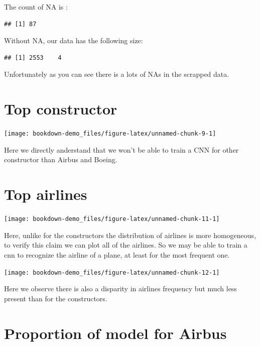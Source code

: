 \documentclass[]{book}
\begin{document}
The count of NA is :

\begin{verbatim}
## [1] 87
\end{verbatim}

Without NA, our data has the following size:

\begin{verbatim}
## [1] 2553    4
\end{verbatim}

Unfortunately as you can see there is a lots of NAs in the scrapped data.

\hypertarget{top-constructor}{%
\section{Top constructor}\label{top-constructor}}

\begin{center}\texttt{[image: bookdown-demo\_files/figure-latex/unnamed-chunk-9-1]} \end{center}

Here we directly anderstand that we won't be able to train a CNN for other constructor than Airbus and Boeing.

\hypertarget{top-airlines}{%
\section{Top airlines}\label{top-airlines}}

\begin{center}\texttt{[image: bookdown-demo\_files/figure-latex/unnamed-chunk-11-1]} \end{center}

Here, unlike for the constructors the distribution of airlines is more homogeneous, to verify this claim we can plot all of the airlines. So we may be able to train a cnn to recognize the airline of a plane, at least for the most frequent one.

\begin{center}\texttt{[image: bookdown-demo\_files/figure-latex/unnamed-chunk-12-1]} \end{center}

Here we observe there is also a disparity in airlines frequency but much less present than for the constructors.

\hypertarget{proportion-of-model-for-airbus}{%
\section{Proportion of model for Airbus}\label{proportion-of-model-for-airbus}}
\end{document}
